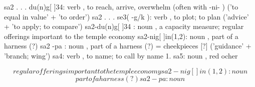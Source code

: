 
\begin{tzpsnapshot}
\end{tzpsnapshot}

sa2 . . . du(n)g[ ]34: verb , to reach, arrive, overwhelm (often with -ni- ) ('to equal in value' + 'to order') sa2 . . . se3( -g/k ): verb , to plot; to plan ('advice' + 'to apply; to compare') sa2-du(n)g[ ]34 : noun , a capacity measure; regular offerings important to the temple economy sa2-nig[ ]in(1,2): noun , part of a harness (?) sa2 -pa : noun , part of a harness (?) = cheekpieces [?] ('guidance' + 'branch; wing') sa4: verb , to name; to call by name 1. sa5: noun , red ocher

\[
regular offerings important to the temple economy sa2-nig[ ]in(1,2): noun
\]
\[
part of a harness (?) sa2 -pa : noun
\]

